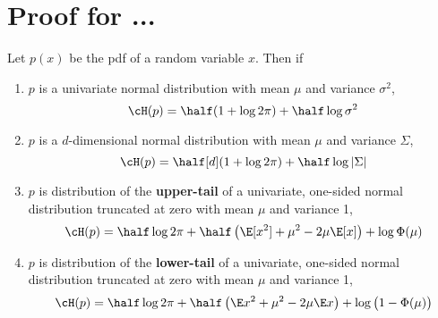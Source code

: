 %

\section{Proof for ...}

\begin{lemma}\label{thm:normentropy}
  Let $p(x)$ be the pdf of a random variable $x$. Then if
  \begin{enumerate}[label=(\roman*)]
    \item $p$ is a univariate normal distribution with mean $\mu$ and variance $\sigma^2$,
    \[
      \cH(p) = \half (1 + \log 2\pi) + \half \log \sigma^2
    \]
    \item $p$ is a $d$-dimensional normal distribution with mean $\mu$ and variance $\Sigma$,
    \[
      \cH(p) = \half[d] (1 + \log 2\pi) + \half \log \vert \Sigma \vert 
    \]
    \item $p$ is distribution of the \textbf{upper-tail} of a univariate, one-sided normal distribution truncated at zero with mean $\mu$ and variance 1,
    \[
      \cH(p) = \half \log 2\pi + \half \left( \E [x^2] + \mu^2 - 2\mu\E [x] \right) + \log \Phi(\mu)
    \]
    \item $p$ is distribution of the \textbf{lower-tail} of a univariate, one-sided normal distribution truncated at zero with mean $\mu$ and variance 1,
    \[
      \cH(p) = \half \log 2\pi + \half \left( \E x^2 + \mu^2 - 2\mu\E x \right) + \log \big(1 - \Phi(\mu)\big)
    \]
  \end{enumerate}
\end{lemma}


